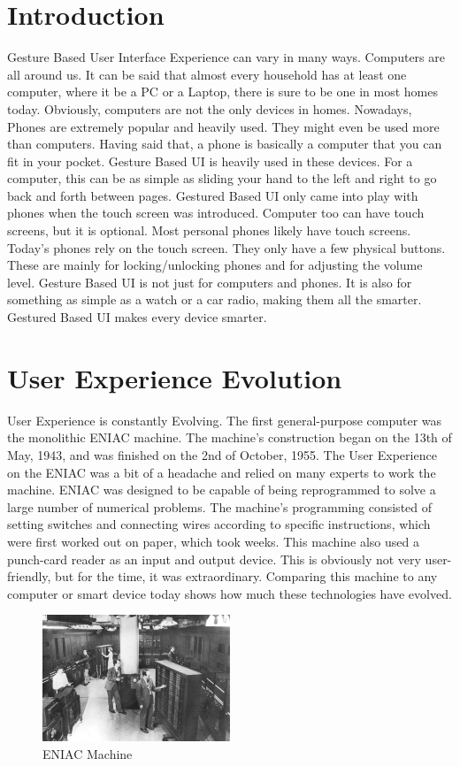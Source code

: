 \documentclass{article}
\begin{document}
\section{Introduction}
Gesture Based User Interface Experience can vary in many ways. Computers are all around us. It can be said that almost every household has at least one computer, where it be a PC or a Laptop, there is sure to be one in most homes today. Obviously, computers are not the only devices in homes. Nowadays, Phones are extremely popular and heavily used. They might even be used more than computers. Having said that, a phone is basically a computer that you can fit in your pocket. Gesture Based UI is heavily used in these devices. For a computer, this can be as simple as sliding your hand to the left and right to go back and forth between pages. Gestured Based UI only came into play with phones when the touch screen was introduced. Computer too can have touch screens, but it is optional. Most personal phones likely have touch screens. Today's phones rely on the touch screen. They only have a few physical buttons. These are mainly for locking/unlocking phones and for adjusting the volume level. Gesture Based UI is not just for computers and phones. It is also for something as simple as a watch or a car radio, making them all the smarter. Gestured Based UI makes every device smarter.

\section{User Experience Evolution}
User Experience is constantly Evolving. The first general-purpose computer was the monolithic ENIAC machine. The machine's construction began on the 13th of May, 1943, and was finished on the 2nd of October, 1955. The User Experience on the ENIAC was a bit of a headache and relied on many experts to work the machine. ENIAC was designed to be capable of being reprogrammed to solve a large number of numerical problems. The machine's programming consisted of setting switches and connecting wires according to specific instructions, which were first worked out on paper, which took weeks. This machine also used a punch-card reader as an input and output device. This is obviously not very user-friendly, but for the time, it was extraordinary. Comparing this machine to any computer or smart device today shows how much these technologies have evolved. \cite{ref1}

\begin{figure}[h!]
    \caption{ENIAC Machine \cite{ref2}}
    \label{image:ENIAC}
    \centering
    \includegraphics[width=0.5\textwidth]{pics/eniac.jpg}
\end{figure}
\end{document}

